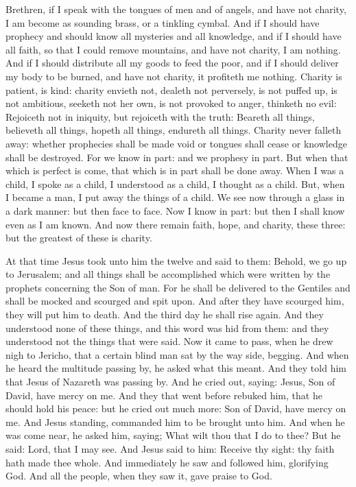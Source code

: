 \begin{multicols}{2}
Brethren, if I speak with the tongues of men and of angels, and have not charity, I am
become as sounding brass, or a tinkling cymbal.  And if I should have prophecy
and should know all mysteries and all knowledge, and if I should have all
faith, so that I could remove mountains, and have not charity, I am nothing.
And if I should distribute all my goods to feed the poor, and if I should
deliver my body to be burned, and have not charity, it profiteth me nothing.
Charity is patient, is kind: charity envieth not, dealeth not perversely, is
not puffed up, is not ambitious, seeketh not her own, is not provoked to anger,
thinketh no evil: Rejoiceth not in iniquity, but rejoiceth with the truth:
Beareth all things, believeth all things, hopeth all things, endureth all
things.  Charity never falleth away: whether prophecies shall be made void or
tongues shall cease or knowledge shall be destroyed.  For we know in part: and
we prophesy in part.  But when that which is perfect is come, that which is in
part shall be done away.  When I was a child, I spoke as a child, I understood
as a child, I thought as a child. But, when I became a man, I put away the
things of a child.  We see now through a glass in a dark manner: but then face
to face. Now I know in part: but then I shall know even as I am known.  And now
there remain faith, hope, and charity, these three: but the greatest of these
is charity.




At that time Jesus took unto him the twelve and said to them: Behold, we go up to
Jerusalem; and all things shall be accomplished which were written by the
prophets concerning the Son of man.  For he shall be delivered to the Gentiles
and shall be mocked and scourged and spit upon.  And after they have scourged
him, they will put him to death. And the third day he shall rise again.  And
they understood none of these things, and this word was hid from them: and they
understood not the things that were said.  Now it came to pass, when he drew
nigh to Jericho, that a certain blind man sat by the way side, begging.  And
when he heard the multitude passing by, he asked what this meant.  And they
told him that Jesus of Nazareth was passing by.  And he cried out, saying:
Jesus, Son of David, have mercy on me.  And they that went before rebuked him,
that he should hold his peace: but he cried out much more: Son of David, have
mercy on me.  And Jesus standing, commanded him to be brought unto him.  And
when he was come near, he asked him, saying; What wilt thou that I do to thee?
But he said: Lord, that I may see.  And Jesus said to him: Receive thy sight:
thy faith hath made thee whole.  And immediately he saw and followed him,
glorifying God.  And all the people, when they saw it, gave praise to God.


\end{multicols}
